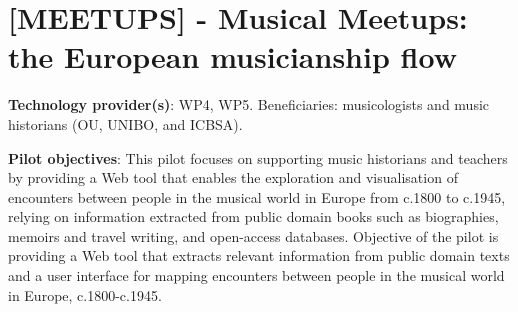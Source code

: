 \section{[MEETUPS] - Musical Meetups: the European musicianship flow}\label{sec:pilot:meetups}

\textbf{Technology provider(s)}: WP4, WP5.
Beneficiaries: musicologists and music historians (OU, UNIBO, and ICBSA). 

\textbf{Pilot objectives}: This pilot focuses on supporting music historians and teachers by providing a Web tool that enables the exploration and visualisation of encounters between people in the musical world in Europe from c.1800 to c.1945, relying on information extracted from public domain books such as biographies, memoirs and travel writing, and open-access databases. Objective of the pilot is providing a Web tool that extracts relevant information from public domain texts and a user interface for mapping encounters between people in the musical world in Europe, c.1800-c.1945. 

